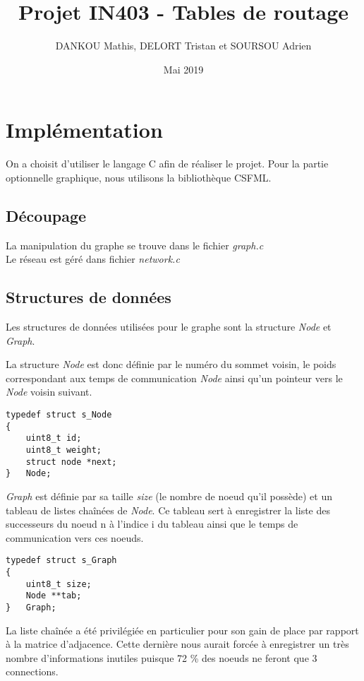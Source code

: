 \documentclass{article}
\title{Projet IN403 - Tables de routage}
\author{DANKOU Mathis, DELORT Tristan et SOURSOU Adrien}
\date{Mai 2019}
\begin{document}
\maketitle
\tableofcontents\break
\section{Implémentation}

On a choisit d'utiliser le langage C afin de réaliser le projet. Pour la partie optionnelle graphique, nous utilisons la bibliothèque CSFML.

\subsection{Découpage}
La manipulation du graphe se trouve dans le fichier \textit{graph.c} \\
Le réseau est géré dans fichier \textit{network.c}

\subsection{Structures de données}
Les structures de données utilisées pour le graphe sont la structure \textit{Node} et \textit{Graph}. \\
\par La structure \textit{Node} est donc définie par le numéro du sommet voisin, le poids correspondant aux temps de communication \textit{Node} ainsi qu'un pointeur vers le \textit{Node} voisin suivant.
\begin{verbatim}
typedef struct s_Node
{
    uint8_t id;
    uint8_t weight;
    struct node *next;
}   Node;
\end{verbatim}

\textit{Graph} est définie par sa taille \textit{size} (le nombre de noeud qu'il possède) et un tableau de listes chaînées de \textit{Node}. Ce tableau sert à enregistrer la liste des successeurs du noeud n à l'indice i du tableau ainsi que le temps de communication vers ces noeuds.

\begin{verbatim}
typedef struct s_Graph
{
    uint8_t size;
    Node **tab;
}   Graph;
\end{verbatim}

La liste chaînée a été privilégiée en particulier pour son gain de place par rapport à la matrice d'adjacence. Cette dernière nous aurait forcée à enregistrer un très nombre d'informations inutiles puisque 72 \% des noeuds ne feront que 3 connections.
\end{document}
